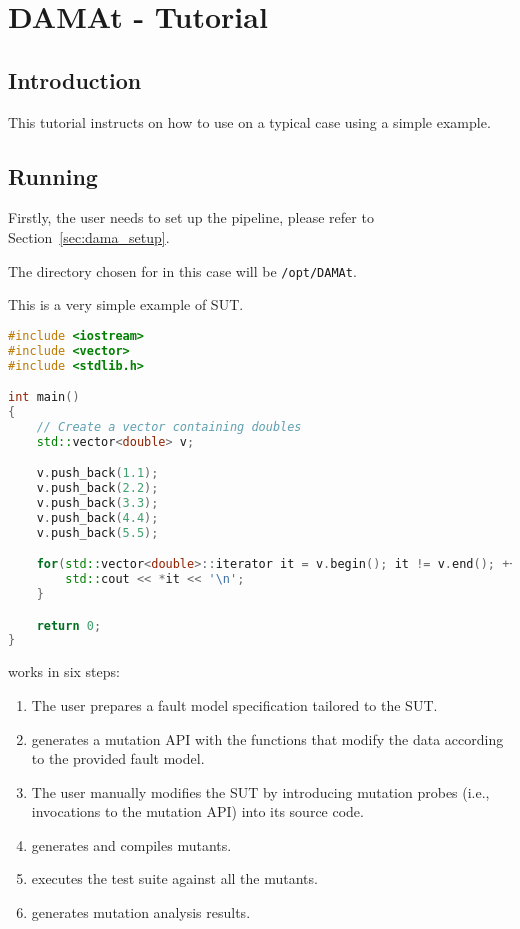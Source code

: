 
\chapter{DAMAt - Tutorial}
\label{chapter:dama:tutorial}

\section{Introduction}

This tutorial instructs on how to use \DAMA on a typical case using a simple example.

\section{Running \DAMA}
\label{sec:dama_single_machine}

Firstly, the user needs to set up the \DAMA pipeline, please refer to Section~\ref{sec:dama_setup}.

The directory chosen for \DAMA in this case will be \texttt{/opt/DAMAt}.

This is a very simple example of SUT.

\begin{lstlisting}[language=c++]
#include <iostream>
#include <vector>
#include <stdlib.h>

int main()
{
    // Create a vector containing doubles
    std::vector<double> v;

    v.push_back(1.1);
    v.push_back(2.2);
    v.push_back(3.3);
    v.push_back(4.4);
    v.push_back(5.5);

    for(std::vector<double>::iterator it = v.begin(); it != v.end(); ++it) {
    	std::cout << *it << '\n';
    }

    return 0;
}
\end{lstlisting}

\DAMA works in six steps:

\begin{enumerate}
	\item The user prepares a fault model specification tailored to the SUT.
	\item \DAMA generates a mutation API with the functions that modify the data according to the provided fault model.
	\item The user manually modifies the SUT by introducing mutation probes (i.e., invocations to the mutation API) into its source code.
	\item \DAMA generates and compiles mutants.
	\item \DAMA executes the test suite against all the mutants.
	\item \DAMA generates mutation analysis results.
\end{enumerate}



